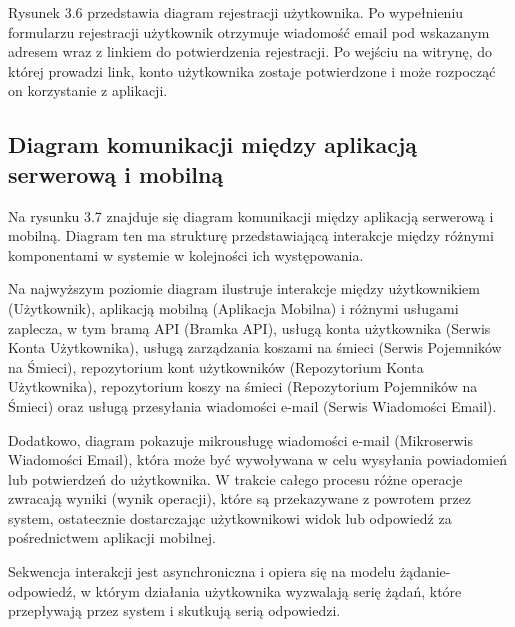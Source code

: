 \documentclass[12pt, a4paper, twoside, openany]{book}
\newcommand{\forceindent}{\leavevmode{\parindent=1.3em\indent}}
\begin{document}
{Rysunek 3.6 przedstawia diagram rejestracji użytkownika. Po wypełnieniu formularzu rejestracji użytkownik otrzymuje wiadomość email pod wskazanym adresem wraz z linkiem do potwierdzenia rejestracji. Po wejściu na witrynę, do której prowadzi link, konto użytkownika zostaje potwierdzone i może rozpocząć on korzystanie z aplikacji.


\subsection{Diagram komunikacji między aplikacją serwerową i mobilną}

\forceindent Na rysunku 3.7 znajduje się diagram komunikacji między aplikacją serwerową i mobilną.
Diagram ten ma strukturę przedstawiającą interakcje między różnymi komponentami w systemie w kolejności ich występowania.

Na najwyższym poziomie diagram ilustruje interakcje między użytkownikiem (Użytkownik), aplikacją mobilną (Aplikacja Mobilna) i różnymi usługami zaplecza, w tym bramą API (Bramka API), usługą konta użytkownika (Serwis Konta Użytkownika), usługą zarządzania koszami na śmieci (Serwis Pojemników na Śmieci), repozytorium kont użytkowników (Repozytorium Konta Użytkownika), repozytorium koszy na śmieci (Repozytorium Pojemników na Śmieci) oraz usługą przesyłania wiadomości e-mail (Serwis Wiadomości Email).

Dodatkowo, diagram pokazuje mikrousługę wiadomości e-mail (Mikroserwis Wiadomości Email), która może być wywoływana w celu wysyłania powiadomień lub potwierdzeń do użytkownika. W trakcie całego procesu różne operacje zwracają wyniki (wynik operacji), które są przekazywane z powrotem przez system, ostatecznie dostarczając użytkownikowi widok lub odpowiedź za pośrednictwem aplikacji mobilnej.

Sekwencja interakcji jest asynchroniczna i opiera się na modelu żądanie-odpowiedź, w którym działania użytkownika wyzwalają serię żądań, które przepływają przez system i skutkują serią odpowiedzi.

}
\end{document}
